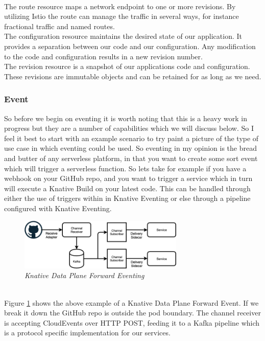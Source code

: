 \\The route resource maps a network endpoint to one or more revisions. By utilizing Istio the route can manage the traffic in several ways, for instance fractional traffic and named routes.
\\The configuration resource maintains the desired state of our application. It provides a separation between our code and our configuration. Any modification to the code and configuration results in a new revision number. 
\\The revision resource is a snapshot of our applications code and configuration. These revisions are immutable objects and can be retained for as long as we need.

\subsubsection{Event}
So before we begin on eventing it is worth noting that this is a heavy work in progress but they are a number of capabilities which we will discuss below. So I feel it best to start with an example scenario to try paint a picture of the type of use case in which eventing could be used. So eventing in my opinion is the bread and butter of any serverless platform, in that you want to create some sort event which will trigger a serverless function. So lets take for example if you have a webhook on your GitHub repo, and you want to trigger a service which in turn will execute a Knative Build on your latest code. This can be handled through either the use of triggers within in Knative Eventing or else through a pipeline configured with Knative Eventing.
\begin{figure}[!ht]
\centering
\includegraphics*[width=0.7\textwidth]{images/knative-eventing.png}
\caption{\em Knative Data Plane Forward Eventing}
\label{img:knative-event1}
\end{figure}
\\Figure \ref{img:knative-event1} shows the above example of a Knative Data Plane Forward Event. If we break it down the GitHub repo is outside the pod boundary. The channel receiver is accepting CloudEvents over HTTP POST, feeding it to a Kafka pipeline which is a protocol specific implementation for our services.
